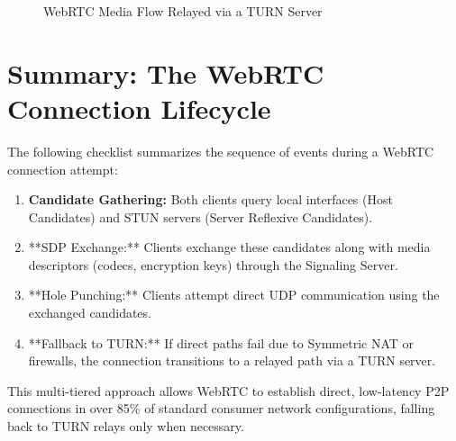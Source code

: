\documentclass[11pt,a4paper]{article}
\begin{document}
\begin{figure}[h!]
\centering
{}
\caption{WebRTC Media Flow Relayed via a TURN Server}
\label{fig:turn_relay}
\end{figure}

\section{Summary: The WebRTC Connection Lifecycle}

The following checklist summarizes the sequence of events during a WebRTC connection attempt:

\begin{enumerate}
    \item \textbf{Candidate Gathering:} Both clients query local interfaces (Host Candidates) and STUN servers (Server Reflexive Candidates).
    \item **SDP Exchange:** Clients exchange these candidates along with media descriptors (codecs, encryption keys) through the Signaling Server.
    \item **Hole Punching:** Clients attempt direct UDP communication using the exchanged candidates.
    \item **Fallback to TURN:** If direct paths fail due to Symmetric NAT or firewalls, the connection transitions to a relayed path via a TURN server.
\end{enumerate}

This multi-tiered approach allows WebRTC to establish direct, low-latency P2P connections in over 85\% of standard consumer network configurations, falling back to TURN relays only when necessary.
\end{document}
